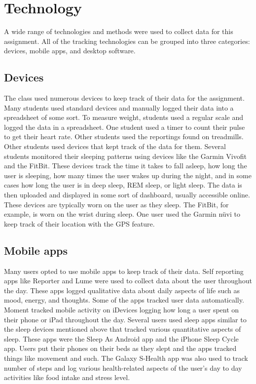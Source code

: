 \section{Technology}
A wide range of technologies and methods were used to collect data for this assignment. All of the tracking technologies can be grouped into three categories: devices, mobile apps, and desktop software. 
\subsection{Devices}
    The class used numerous devices to keep track of their data for the assignment. Many students used standard devices and manually logged their data into a spreadsheet of some sort. To measure weight, students used a regular scale and logged the data in a spreadsheet. One student used a timer to count their pulse to get their heart rate. Other students used the reportings found on treadmills. 
    Other students used devices that kept track of the data for them. Several students monitored their sleeping patterns using devices like the Garmin Vivofit and the FitBit. These devices track the time it takes to fall asleep, how long the user is sleeping, how many times the user wakes up during the night, and in some cases how long the user is in deep sleep, REM sleep, or light sleep. The data is then uploaded and displayed in some sort of dashboard, usually accessible online. These devices are typically worn on the user as they sleep. The FitBit, for example, is worn on the wrist during sleep. One user used the Garmin  nüvi to keep track of their location with the GPS feature. 

\subsection{Mobile apps} 
    Many users opted to use mobile apps to keep track of their data. Self reporting apps like Reporter and Lume were used to collect data about the user throughout the day. These apps logged qualitative data about daily aspects of life such as mood, energy, and thoughts. 
    Some of the apps tracked user data automatically. Moment tracked mobile activity on iDevices logging how long a user spent on their phone or iPad throughout the day. Several users used sleep apps similar to the sleep devices mentioned above that tracked various quantitative aspects of sleep. These apps were the Sleep As Android app and the iPhone Sleep Cycle app. Users put their phones on their beds as they slept and the apps tracked things like movement and such. The Galaxy S-Health app was also used to track number of steps and log various health-related aspects of the user’s day to day activities like food intake and stress level.
    
